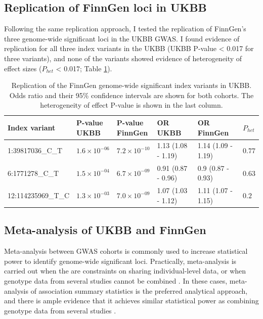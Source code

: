   \subsection{Replication of FinnGen loci in UKBB}
  Following the same replication approach, I tested the replication of FinnGen's three genome-wide significant loci in the UKBB GWAS. I found evidence of replication for all three index variants in the UKBB (UKBB P-value < 0.017 for three variants), and none of the variants showed evidence of heterogeneity of effect sizes ($P_{het}$ < 0.017; Table \ref{table:replication_finngen_in_ukbb}).

  \begin{table}[H]
    \centering\begingroup\fontsize{10}{12}\selectfont
    \caption[Replication of the FinnGen genome-wide significant index variants in the UKBB]{Replication of the FinnGen genome-wide significant index variants in UKBB. Odds ratio and their 95\% confidence  intervals are shown for both cohorts. The heterogeneity of effect P-value is shown in the last column.}
    \label{table:replication_finngen_in_ukbb}
    \begin{tabular}[t]{llllll}
    \toprule
    Index variant & \makecell{P-value\\ UKBB} & \makecell{P-value\\ FinnGen} & \makecell{OR\\ UKBB} & \makecell{OR\\ FinnGen} & $P_{het}$\\
    \midrule
    1:39817036\_C\_T & $1.6\times10^{-06}$ & $7.2\times10^{-10}$ & 1.13 (1.08 - 1.19) & 1.14 (1.09 - 1.19) & $0.77$\\
    6:1771278\_C\_T & $1.5\times10^{-04}$ & $6.7\times10^{-09}$ & 0.91 (0.87 - 0.96) & 0.9 (0.87 - 0.93) & $0.63$\\
    12:114235969\_T\_C & $1.3\times10^{-03}$ & $7.0\times10^{-09}$ & 1.07 (1.03 - 1.12) & 1.11 (1.07 - 1.15) & $0.2$\\
    \bottomrule
    \end{tabular}
    \endgroup{}
    \end{table}


    \subsection{Meta-analysis of UKBB and FinnGen}
    Meta-analysis between GWAS cohorts is commonly used to increase statistical power to identify genome-wide significant loci. Practically, meta-analysis is carried out when the are constraints on sharing individual-level data, or when genotype data from several studies cannot be combined \cite{Evangelou2013-rn}. In these cases, meta-analysis of association summary statistics is the preferred analytical approach, and there is ample evidence that it achieves similar statistical power as combining genotype data from several studies \cite{metal_docs}. \\



